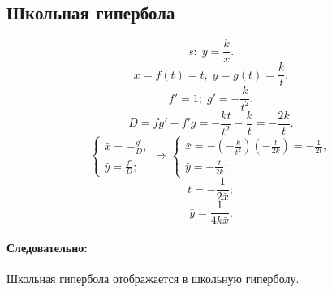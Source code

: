 \subsection{Школьная гипербола}
$$s:\; y = \frac{k}{x}.$$
$$x = f(t) = t,\; y = g(t) = \frac{k}{t}.$$
$$f' = 1; \; g' = -\frac{k}{t^2}.$$
$$D = fg' - f'g = -\frac{kt}{t^2} - \frac{k}{t} = - \frac{2k}{t}.$$
$$
\left\{
\begin{gathered}
	\bar{x} = -\frac{g'}{D}, \\
	\bar{y} = \frac{f'}{D};
\end{gathered}
\right.
\Rightarrow
\left\{
\begin{gathered}
	\bar{x} 
		= -\left(-\frac{k}{t^2}\right)\left(-\frac{t}{2k}\right) 
		= - \frac{1}{2t}, \\
	\bar{y} = -\frac{t}{2k};
\end{gathered}
\right.
$$
$$t = -\frac{1}{2\bar{x}};$$
$$\bar{y} = \frac{1}{4k\bar{x}}.$$
\paragraph{Следовательно:} Школьная гипербола отображается в школьную гиперболу.